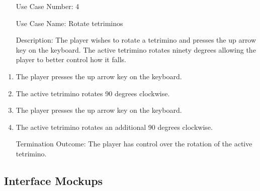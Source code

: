 \documentclass[10pt,conference,onecolumn,compsoc]{IEEEtran}
\begin{document}
\begin{itemize}
\item[Use Case Number:] 4
\item[Use Case Name:] Rotate tetriminos
\item[Description:] The player wishes to rotate a tetrimino and presses the up arrow key on the keyboard. The active tetrimino rotates ninety degrees allowing the player to better control how it falls.
\end{itemize}
\begin{enumerate}
\item The player presses the up arrow key on the keyboard.
\item The active tetrimino rotates 90 degrees clockwise.
\item The player presses the up arrow key on the keyboard.
\item The active tetrimino rotates an additional 90 degrees clockwise.
\item[Termination Outcome:] The player has control over the rotation of the active tetrimino.
\end{enumerate}
\medskip

\subsection{Interface Mockups}
\end{document}

